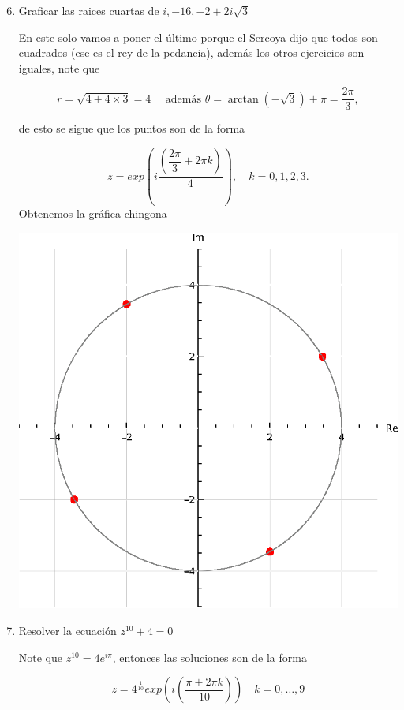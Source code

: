 \documentclass[11pt]{article}
\begin{document}
\begin{enumerate}
  \setcounter{enumi}{5}
  \item Graficar las raices cuartas de $i,-16,-2+2 i \sqrt{3}$

En este solo vamos a poner el último porque el Sercoya dijo que todos son cuadrados (ese es el rey de la pedancia), además los otros ejercicios son iguales, note que

$$r=\sqrt{4+4\times 3}=4 \quad \text{ además } \theta=\arctan\left(-\sqrt{3}\right) +\pi=\frac{2\pi}{3},$$

de esto se sigue que los puntos son de la forma

$$z=exp\left(i\frac{\left(\dfrac{2\pi}{3}+2\pi k\right)}{4}\right) , \quad k=0,1,2,3.$$
Obtenemos la gráfica chingona 

\begin{center}
\includegraphics[scale=0.8]{Punto6.eps}
\end{center}

  \item Resolver la ecuación $z^{10}+4=0$

Note que $z^{10}=4e^{i\pi}$, entonces las soluciones son de la forma 

$$z=4^{\frac{1}{10}}exp\left(i\left(\displaystyle\frac{\pi+2\pi k}{10}\right)\right) \quad k=0,\ldots,9$$


\end{enumerate}
\end{document}
